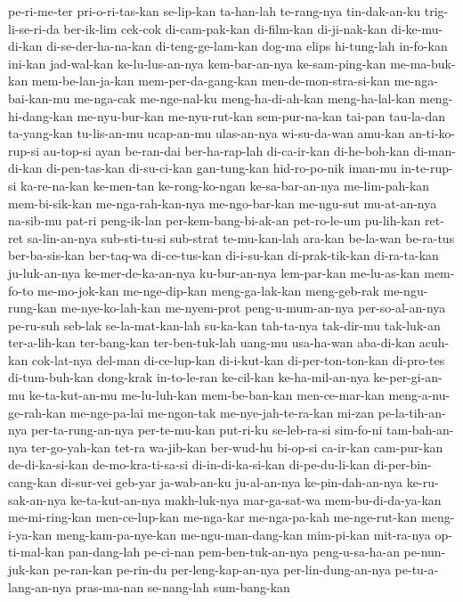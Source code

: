 {pe-ri-me-ter pri-o-ri-tas-kan se-lip-kan ta-han-lah te-rang-nya tin-dak-an-ku trig-li-se-ri-da ber-ik-lim
cek-cok di-cam-pak-kan di-film-kan di-ji-nak-kan di-ke-mu-di-kan di-se-der-ha-na-kan di-teng-ge-lam-kan dog-ma
elips hi-tung-lah in-fo-kan ini-kan jad-wal-kan ke-lu-lus-an-nya kem-bar-an-nya ke-sam-ping-kan
me-ma-buk-kan mem-be-lan-ja-kan mem-per-da-gang-kan men-de-mon-stra-si-kan me-nga-bai-kan-mu me-nga-cak me-nge-nal-ku meng-ha-di-ah-kan
meng-ha-lal-kan meng-hi-dang-kan me-nyu-bur-kan me-nyu-rut-kan sem-pur-na-kan tai-pan tau-la-dan ta-yang-kan
tu-lis-an-mu ucap-an-mu ulas-an-nya wi-su-da-wan amu-kan an-ti-ko-rup-si au-top-si ayan
be-ran-dai ber-ha-rap-lah di-ca-ir-kan di-he-boh-kan di-man-di-kan di-pen-tas-kan di-su-ci-kan gan-tung-kan
hid-ro-po-nik iman-mu in-te-rup-si ka-re-na-kan ke-men-tan ke-rong-ko-ngan ke-sa-bar-an-nya me-lim-pah-kan
mem-bi-sik-kan me-nga-rah-kan-nya me-ngo-bar-kan me-ngu-sut mu-at-an-nya na-sib-mu pat-ri peng-ik-lan
per-kem-bang-bi-ak-an pet-ro-le-um pu-lih-kan ret-ret sa-lin-an-nya sub-sti-tu-si sub-strat te-mu-kan-lah
ara-kan be-la-wan be-ra-tus ber-ba-sis-kan ber-taq-wa di-ce-tus-kan di-i-su-kan di-prak-tik-kan
di-ra-ta-kan ju-luk-an-nya ke-mer-de-ka-an-nya ku-bur-an-nya lem-par-kan me-lu-as-kan mem-fo-to me-mo-jok-kan
me-nge-dip-kan meng-ga-lak-kan meng-geb-rak me-ngu-rung-kan me-nye-ko-lah-kan me-nyem-prot peng-u-mum-an-nya per-so-al-an-nya
pe-ru-suh seb-lak se-la-mat-kan-lah su-ka-kan tah-ta-nya tak-dir-mu tak-luk-an ter-a-lih-kan
ter-bang-kan ter-ben-tuk-lah uang-mu usa-ha-wan aba-di-kan acuh-kan cok-lat-nya del-man
di-ce-lup-kan di-i-kut-kan di-per-ton-ton-kan di-pro-tes di-tum-buh-kan dong-krak in-to-le-ran ke-cil-kan
ke-ha-mil-an-nya ke-per-gi-an-mu ke-ta-kut-an-mu me-lu-luh-kan mem-be-ban-kan men-ce-mar-kan meng-a-nu-ge-rah-kan me-nge-pa-lai
me-ngon-tak me-nye-jah-te-ra-kan mi-zan pe-la-tih-an-nya per-ta-rung-an-nya per-te-mu-kan put-ri-ku se-leb-ra-si
sim-fo-ni tam-bah-an-nya ter-go-yah-kan tet-ra wa-jib-kan ber-wud-hu bi-op-si ca-ir-kan
cam-pur-kan de-di-ka-si-kan de-mo-kra-ti-sa-si di-in-di-ka-si-kan di-pe-du-li-kan di-per-bin-cang-kan di-sur-vei geb-yar
ja-wab-an-ku ju-al-an-nya ke-pin-dah-an-nya ke-ru-sak-an-nya ke-ta-kut-an-nya makh-luk-nya mar-ga-sat-wa mem-bu-di-da-ya-kan
me-mi-ring-kan men-ce-lup-kan me-nga-kar me-nga-pa-kah me-nge-rut-kan meng-i-ya-kan meng-kam-pa-nye-kan me-ngu-man-dang-kan
mim-pi-kan mit-ra-nya op-ti-mal-kan pan-dang-lah pe-ci-nan pem-ben-tuk-an-nya peng-u-sa-ha-an pe-nun-juk-kan
pe-ran-kan pe-rin-du per-leng-kap-an-nya per-lin-dung-an-nya pe-tu-a-lang-an-nya pras-ma-nan se-nang-lah sum-bang-kan
}

